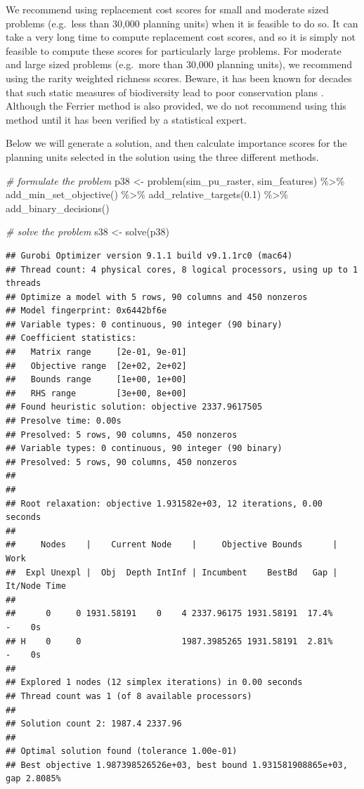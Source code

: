 \documentclass[
  12pt,
]{book}
\newenvironment{Shaded}{\begin{snugshade}}{\end{snugshade}}
\newcommand{\CommentTok}[1]{\textcolor[rgb]{0.56,0.35,0.01}{\textit{#1}}}
\newcommand{\FloatTok}[1]{\textcolor[rgb]{0.00,0.00,0.81}{#1}}
\newcommand{\FunctionTok}[1]{\textcolor[rgb]{0.00,0.00,0.00}{#1}}
\newcommand{\NormalTok}[1]{#1}
\newcommand{\OtherTok}[1]{\textcolor[rgb]{0.56,0.35,0.01}{#1}}
\newcommand{\SpecialCharTok}[1]{\textcolor[rgb]{0.00,0.00,0.00}{#1}}
\begin{document}
We recommend using replacement cost scores for small and moderate sized problems (e.g.~less than 30,000 planning units) when it is feasible to do so. It can take a very long time to compute replacement cost scores, and so it is simply not feasible to compute these scores for particularly large problems. For moderate and large sized problems (e.g.~more than 30,000 planning units), we recommend using the rarity weighted richness scores. Beware, it has been known for decades that such static measures of biodiversity lead to poor conservation plans \citep{r17}. Although the Ferrier method is also provided, we do not recommend using this method until it has been verified by a statistical expert.

Below we will generate a solution, and then calculate importance scores for the planning units selected in the solution using the three different methods.

\begin{Shaded}
\begin{Highlighting}[]
\CommentTok{\# formulate the problem}
\NormalTok{p38 }\OtherTok{\textless{}{-}} \FunctionTok{problem}\NormalTok{(sim\_pu\_raster, sim\_features) }\SpecialCharTok{\%\textgreater{}\%}
  \FunctionTok{add\_min\_set\_objective}\NormalTok{() }\SpecialCharTok{\%\textgreater{}\%}
  \FunctionTok{add\_relative\_targets}\NormalTok{(}\FloatTok{0.1}\NormalTok{) }\SpecialCharTok{\%\textgreater{}\%}
  \FunctionTok{add\_binary\_decisions}\NormalTok{()}

\CommentTok{\# solve the problem}
\NormalTok{s38 }\OtherTok{\textless{}{-}} \FunctionTok{solve}\NormalTok{(p38)}
\end{Highlighting}
\end{Shaded}

\begin{verbatim}
## Gurobi Optimizer version 9.1.1 build v9.1.1rc0 (mac64)
## Thread count: 4 physical cores, 8 logical processors, using up to 1 threads
## Optimize a model with 5 rows, 90 columns and 450 nonzeros
## Model fingerprint: 0x6442bf6e
## Variable types: 0 continuous, 90 integer (90 binary)
## Coefficient statistics:
##   Matrix range     [2e-01, 9e-01]
##   Objective range  [2e+02, 2e+02]
##   Bounds range     [1e+00, 1e+00]
##   RHS range        [3e+00, 8e+00]
## Found heuristic solution: objective 2337.9617505
## Presolve time: 0.00s
## Presolved: 5 rows, 90 columns, 450 nonzeros
## Variable types: 0 continuous, 90 integer (90 binary)
## Presolved: 5 rows, 90 columns, 450 nonzeros
## 
## 
## Root relaxation: objective 1.931582e+03, 12 iterations, 0.00 seconds
## 
##     Nodes    |    Current Node    |     Objective Bounds      |     Work
##  Expl Unexpl |  Obj  Depth IntInf | Incumbent    BestBd   Gap | It/Node Time
## 
##      0     0 1931.58191    0    4 2337.96175 1931.58191  17.4%     -    0s
## H    0     0                    1987.3985265 1931.58191  2.81%     -    0s
## 
## Explored 1 nodes (12 simplex iterations) in 0.00 seconds
## Thread count was 1 (of 8 available processors)
## 
## Solution count 2: 1987.4 2337.96 
## 
## Optimal solution found (tolerance 1.00e-01)
## Best objective 1.987398526526e+03, best bound 1.931581908865e+03, gap 2.8085%
\end{verbatim}
\end{document}
